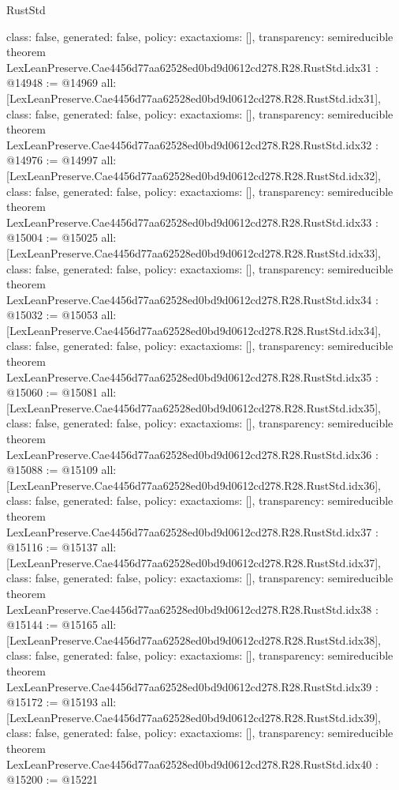 \begin{lexlean}{RustStd}
\begin{coremodule}
{  class: false,
  generated: false,
  policy: exact{axioms: []},
  transparency: semireducible
}
theorem LexLeanPreserve.Cae4456d77aa62528ed0bd9d0612cd278.R28.RustStd.idx31 : @14948 := @14969 {
  all: [LexLeanPreserve.Cae4456d77aa62528ed0bd9d0612cd278.R28.RustStd.idx31],
  class: false,
  generated: false,
  policy: exact{axioms: []},
  transparency: semireducible
}
theorem LexLeanPreserve.Cae4456d77aa62528ed0bd9d0612cd278.R28.RustStd.idx32 : @14976 := @14997 {
  all: [LexLeanPreserve.Cae4456d77aa62528ed0bd9d0612cd278.R28.RustStd.idx32],
  class: false,
  generated: false,
  policy: exact{axioms: []},
  transparency: semireducible
}
theorem LexLeanPreserve.Cae4456d77aa62528ed0bd9d0612cd278.R28.RustStd.idx33 : @15004 := @15025 {
  all: [LexLeanPreserve.Cae4456d77aa62528ed0bd9d0612cd278.R28.RustStd.idx33],
  class: false,
  generated: false,
  policy: exact{axioms: []},
  transparency: semireducible
}
theorem LexLeanPreserve.Cae4456d77aa62528ed0bd9d0612cd278.R28.RustStd.idx34 : @15032 := @15053 {
  all: [LexLeanPreserve.Cae4456d77aa62528ed0bd9d0612cd278.R28.RustStd.idx34],
  class: false,
  generated: false,
  policy: exact{axioms: []},
  transparency: semireducible
}
theorem LexLeanPreserve.Cae4456d77aa62528ed0bd9d0612cd278.R28.RustStd.idx35 : @15060 := @15081 {
  all: [LexLeanPreserve.Cae4456d77aa62528ed0bd9d0612cd278.R28.RustStd.idx35],
  class: false,
  generated: false,
  policy: exact{axioms: []},
  transparency: semireducible
}
theorem LexLeanPreserve.Cae4456d77aa62528ed0bd9d0612cd278.R28.RustStd.idx36 : @15088 := @15109 {
  all: [LexLeanPreserve.Cae4456d77aa62528ed0bd9d0612cd278.R28.RustStd.idx36],
  class: false,
  generated: false,
  policy: exact{axioms: []},
  transparency: semireducible
}
theorem LexLeanPreserve.Cae4456d77aa62528ed0bd9d0612cd278.R28.RustStd.idx37 : @15116 := @15137 {
  all: [LexLeanPreserve.Cae4456d77aa62528ed0bd9d0612cd278.R28.RustStd.idx37],
  class: false,
  generated: false,
  policy: exact{axioms: []},
  transparency: semireducible
}
theorem LexLeanPreserve.Cae4456d77aa62528ed0bd9d0612cd278.R28.RustStd.idx38 : @15144 := @15165 {
  all: [LexLeanPreserve.Cae4456d77aa62528ed0bd9d0612cd278.R28.RustStd.idx38],
  class: false,
  generated: false,
  policy: exact{axioms: []},
  transparency: semireducible
}
theorem LexLeanPreserve.Cae4456d77aa62528ed0bd9d0612cd278.R28.RustStd.idx39 : @15172 := @15193 {
  all: [LexLeanPreserve.Cae4456d77aa62528ed0bd9d0612cd278.R28.RustStd.idx39],
  class: false,
  generated: false,
  policy: exact{axioms: []},
  transparency: semireducible
}
theorem LexLeanPreserve.Cae4456d77aa62528ed0bd9d0612cd278.R28.RustStd.idx40 : @15200 := @15221 {
}
\end{coremodule}
\end{lexlean}
